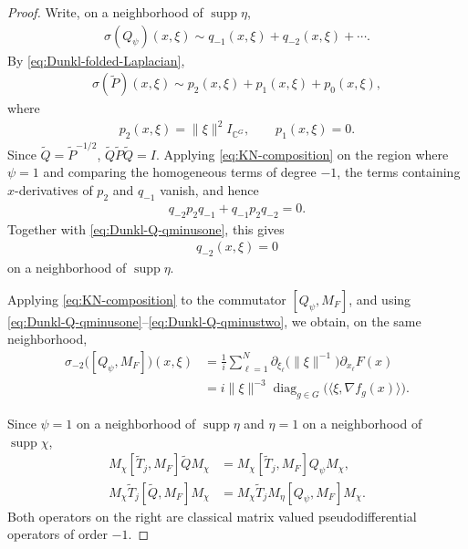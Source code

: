 \documentclass{amsart}
\begin{document}
\begin{proof}
Write, on a neighborhood of \(\operatorname{supp}\eta\),
\begin{align*}
\sigma(Q_\psi)(x,\xi)
\sim
q_{-1}(x,\xi)+q_{-2}(x,\xi)+\cdots.
\end{align*}
By \eqref{eq:Dunkl-folded-Laplacian},
\begin{align*}
\sigma(\widetilde P)(x,\xi)
\sim
p_2(x,\xi)+p_1(x,\xi)+p_0(x,\xi),
\end{align*}
where
\begin{align*}
p_2(x,\xi)
=
\|\xi\|^2I_{\mathbb C^G},
\qquad
p_1(x,\xi)=0.
\end{align*}
Since \(\widetilde Q=\widetilde P^{-1/2}\),
\(\widetilde Q\widetilde P\widetilde Q=I\). Applying
\eqref{eq:KN-composition} on the region where \(\psi=1\) and comparing
the homogeneous terms of degree \(-1\), the terms containing
\(x\)-derivatives of \(p_2\) and \(q_{-1}\) vanish, and hence
\begin{align*}
q_{-2}p_2q_{-1}
+
q_{-1}p_2q_{-2}
=
0.
\end{align*}
Together with \eqref{eq:Dunkl-Q-qminusone}, this gives
\begin{align}
q_{-2}(x,\xi)=0
\label{eq:Dunkl-Q-qminustwo}
\end{align}
on a neighborhood of \(\operatorname{supp}\eta\).

Applying \eqref{eq:KN-composition} to the commutator
\([Q_\psi,M_F]\), and using
\eqref{eq:Dunkl-Q-qminusone}--\eqref{eq:Dunkl-Q-qminustwo}, we obtain,
on the same neighborhood,
\begin{align}
\sigma_{-2}
\big(
[Q_\psi,M_F]
\big)(x,\xi)
&=
\frac{1}{i}
\sum_{\ell=1}^N
\partial_{\xi_\ell}
\big(
\|\xi\|^{-1}
\big)
\partial_{x_\ell}F(x)
\nonumber\\
&=
i\|\xi\|^{-3}
\operatorname{diag}_{g\in G}
\big(
\langle\xi,\nabla f_g(x)\rangle
\big).
\label{eq:Dunkl-QF-principal-symbol}
\end{align}

Since \(\psi=1\) on a neighborhood of
\(\operatorname{supp}\eta\) and
\(\eta=1\) on a neighborhood of
\(\operatorname{supp}\chi\),
\begin{align*}
M_\chi[\widetilde T_j,M_F]\widetilde Q M_\chi
&=
M_\chi[\widetilde T_j,M_F]Q_\psi M_\chi,\\
M_\chi\widetilde T_j[\widetilde Q,M_F]M_\chi
&=
M_\chi\widetilde T_jM_\eta
[Q_\psi,M_F]M_\chi.
\end{align*}
Both operators on the right are classical matrix valued
pseudodifferential operators of order \(-1\).


\end{proof}
\end{document}
